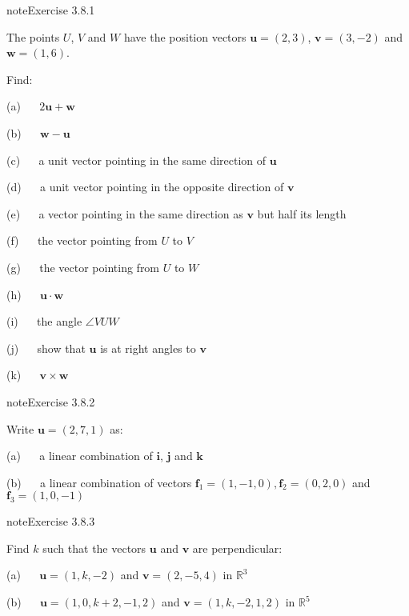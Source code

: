 \documentclass[letterpaper,10pt,english]{jupyterBook}
\begin{document}
\begin{sphinxadmonition}{note}{Exercise 3.8.1}



\sphinxAtStartPar
The points \(U\), \(V\) and \(W\) have the position vectors \(\mathbf{u} = (2, 3)\), \(\mathbf{v} = (3, -2)\) and \(\mathbf{w} = (1, 6)\).

\sphinxAtStartPar
Find:

\sphinxAtStartPar
(a)   \(2 \mathbf{u} + \mathbf{w}\)

\sphinxAtStartPar
(b)   \(\mathbf{w} - \mathbf{u}\)

\sphinxAtStartPar
(c)   a unit vector pointing in the same direction of \(\mathbf{u}\)

\sphinxAtStartPar
(d)   a unit vector pointing in the opposite direction of \(\mathbf{v}\)

\sphinxAtStartPar
(e)   a vector pointing in the same direction as \(\mathbf{v}\) but half its length

\sphinxAtStartPar
(f)   the vector pointing from \(U\) to \(V\)

\sphinxAtStartPar
(g)   the vector pointing from \(U\) to \(W\)

\sphinxAtStartPar
(h)   \(\mathbf{u} \cdot \mathbf{w}\)

\sphinxAtStartPar
(i)   the angle \(\angle VUW\)

\sphinxAtStartPar
(j)   show that \(\mathbf{u}\) is at right angles to \(\mathbf{v}\)

\sphinxAtStartPar
(k)   \(\mathbf{v} \times \mathbf{w}\)
\end{sphinxadmonition}
 \label{exercise:vectors-ex-linear-combination}

\begin{sphinxadmonition}{note}{Exercise 3.8.2}



\sphinxAtStartPar
Write \(\mathbf{u} = (2,7,1)\) as:

\sphinxAtStartPar
(a)   a linear combination of \(\mathbf{i}\), \(\mathbf{j}\) and \(\mathbf{k}\)

\sphinxAtStartPar
(b)   a linear combination of vectors \(\mathbf{f}_1 = (1, -1, 0), \mathbf{f}_2 = (0, 2, 0)\) and \(\mathbf{f}_3 = (1, 0, -1)\)
\end{sphinxadmonition}
 \label{exercise:vectors-ex-perpendicular}

\begin{sphinxadmonition}{note}{Exercise 3.8.3}



\sphinxAtStartPar
Find \(k\) such that the vectors \(\mathbf{u}\) and \(\mathbf{v}\) are perpendicular:

\sphinxAtStartPar
(a)   \(\mathbf{u} =(1, k, -2)\) and \(\mathbf{v} = (2, -5, 4)\) in \(\mathbb{R}^3\)

\sphinxAtStartPar
(b)   \(\mathbf{u} = (1, 0, k+2, -1, 2)\) and \(\mathbf{v} = (1, k, -2, 1, 2)\) in \(\mathbb{R}^5\)
\end{sphinxadmonition}
 \label{exercise:vectors-ex-angle}
\end{document}
